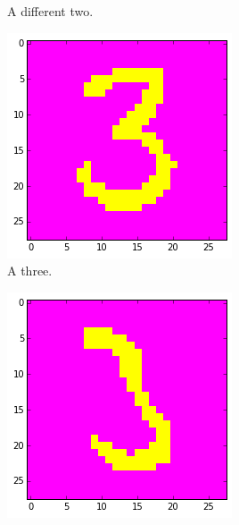 \documentclass[a4paper,10pt]{article}
\numberwithin{equation}{section} %
\numberwithin{figure}{section} %
\numberwithin{table}{section} %
\theoremstyle{mytheor}
\begin{document}
\begin{enumerate}
\begin{figure}[h!]
\begin{subfigure}[b]{0.26\textwidth}
				\caption{A different two.}
			\end{subfigure}
			\begin{subfigure}[b]{0.26\textwidth}
				\includegraphics[width=\textwidth]{digits/skondrie.png}\vspace{-0.4cm}
				\caption{A three.}
			\end{subfigure}
			\begin{subfigure}[b]{0.26\textwidth}
				\includegraphics[width=\textwidth]{digits/rare3.png}\vspace{-0.4cm}

\end{subfigure}
\end{figure}
\end{enumerate}
\end{document}
